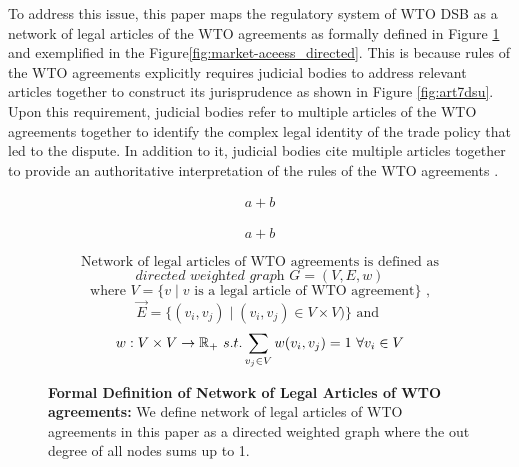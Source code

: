 To address this issue,
this paper maps
the regulatory system of WTO DSB
as a network of legal articles
of the WTO agreements as formally defined in Figure \ref{fig:def} and exemplified in the Figure\ref{fig:market-aceess_directed}. This is because rules of the WTO agreements
explicitly requires judicial bodies to address
relevant articles together to construct its jurisprudence as shown in Figure \ref{fig:art7dsu}.
Upon this requirement, judicial bodies refer to
multiple articles of the WTO agreements together
to identify the complex legal identity of the trade policy that led to the dispute.
In addition to it, judicial bodies cite multiple articles together
to provide an authoritative interpretation of the rules of the WTO agreements
\citep{oesch2003standards}.

\begin{figure}[ht]
    \begin{gather}
    \nonumber{a+b}
    \end{gather}

    \begin{align}
        a+b
    \end{align}


    \[\text{Network of legal articles of WTO agreements is defined as}\] %
    \[ \textit{directed weighted graph }G = (V, E, w) \]
    \[\text{ where } V = \{v \mid v\text{ is a legal article of WTO agreement}\}  \text{ , } \]
    \[\vec{E} = \{(v_i, v_j) \mid (v_i, v_j)\in V \times V)\} \text{ and } \]
    \[w : V \times V \to \Bbb R_{+} \text{ } s.t. \sum_{v_j\in V}{w(v_i, v_j)} = 1 \text{ } \forall v_i \in V\] 
    \caption{\textbf{Formal Definition of Network of Legal Articles of WTO agreements: }We define network of legal articles of WTO agreements in this paper as a directed weighted graph where the out degree of all nodes sums up to 1.}
    \label{fig:def}
\end{figure}

